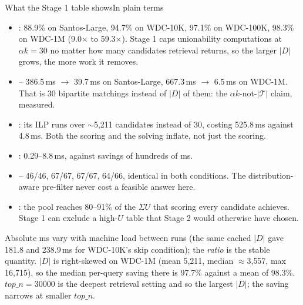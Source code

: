 \begin{frame}{What the Stage 1 table shows}{In plain terms}
\footnotesize
\begin{itemize}
  \item {}: 88.9\% on Santos-Large, 94.7\% on WDC-10K, 97.1\% on WDC-100K, 98.3\% on WDC-1M (9.0$\times$ to 59.3$\times$). Stage 1 caps unionability computations at $\alpha k = 30$ no matter how many candidates retrieval returns, so the larger $|D|$ grows, the more work it removes.
  \item {} -- 386.5\,ms $\to$ 39.7\,ms on Santos-Large, 667.3\,ms $\to$ 6.5\,ms on WDC-1M. That is 30 bipartite matchings instead of $|D|$ of them: the $\alpha k$-not-$|\mathcal{T}|$ claim, measured.
  \item {}: its ILP runs over $\sim$5{,}211 candidates instead of 30, costing 525.8\,ms against 4.8\,ms. Both the scoring and the solving inflate, not just the scoring.
  \item {}: 0.29--8.8\,ms, against savings of hundreds of ms.
  \item {} -- 46/46, 67/67, 67/67, 64/66, identical in both conditions. The distribution-aware pre-filter never cost a feasible answer here.
  \item {}: the pool reaches 80--91\% of the $\Sigma U$ that scoring every candidate achieves. Stage 1 can exclude a high-$U$ table that Stage 2 would otherwise have chosen.
\end{itemize}

\vspace{1pt}
{\footnotesize\color{Muted} Absolute ms vary with machine load between runs (the same cached $|D|$ gave 181.8 and 238.9\,ms for WDC-10K's skip condition); the \emph{ratio} is the stable quantity. $|D|$ is right-skewed on WDC-1M (mean 5{,}211, median $\approx$3{,}557, max 16{,}715), so the median per-query saving there is 97.7\% against a mean of 98.3\%. $top\_n{=}30000$ is the deepest retrieval setting and so the largest $|D|$; the saving narrows at smaller $top\_n$.}
\end{frame}
